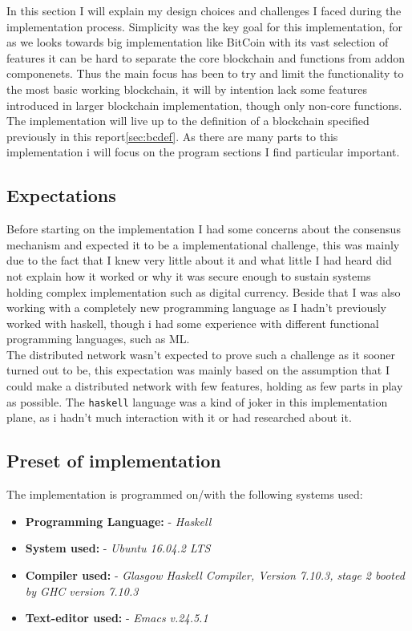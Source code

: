 \documentclass[paper=a4, fontsize=11pt]{scrartcl} %
\numberwithin{equation}{section} %
\numberwithin{figure}{section} %
\numberwithin{table}{section} %
\begin{document}
In this section I will explain my design choices and challenges I faced during the implementation process. Simplicity was the key goal for this implementation, for as we looks towards big implementation like BitCoin with its vast selection of features it can be hard to separate the core blockchain and functions from addon componenets. Thus the main focus has been to try and limit the functionality to the most basic working blockchain, it will by intention lack some features introduced in larger blockchain implementation, though only non-core functions. The implementation will live up to the definition of a blockchain specified previously in this report\ref{sec:bcdef}. As there are many parts to this implementation i will focus on the program sections I find particular important.

\subsection{Expectations}

Before starting on the implementation I had some concerns about the consensus mechanism and expected it to be a implementational challenge, this was mainly due to the fact that I knew very little about it and what little I had heard did not explain how it worked or why it was secure enough to sustain systems holding complex implementation such as digital currency. Beside that I was also working with a completely new programming language as I hadn't previously worked with haskell, though i had some experience with different functional programming languages, such as ML.\\

The distributed network wasn't expected to prove such a challenge as it sooner turned out to be, this expectation was mainly based on the assumption that I could make a distributed network with few features, holding as few parts in play as possible. The \texttt{haskell} language was a kind of joker in this implementation plane, as i hadn't much interaction with it or had researched about it.

\subsection{Preset of implementation}
The implementation is programmed on/with the following systems used:

\begin{itemize}
\item \textbf{Programming Language:} - \textit{Haskell}
\item \textbf{System used:} - \textit{Ubuntu 16.04.2 LTS} 
\item \textbf{Compiler used:} - \textit{Glasgow Haskell Compiler, Version 7.10.3, stage 2 booted by GHC version 7.10.3}
\item \textbf{Text-editor used:} - \textit{Emacs v.24.5.1}
\end{itemize}
\end{document}
